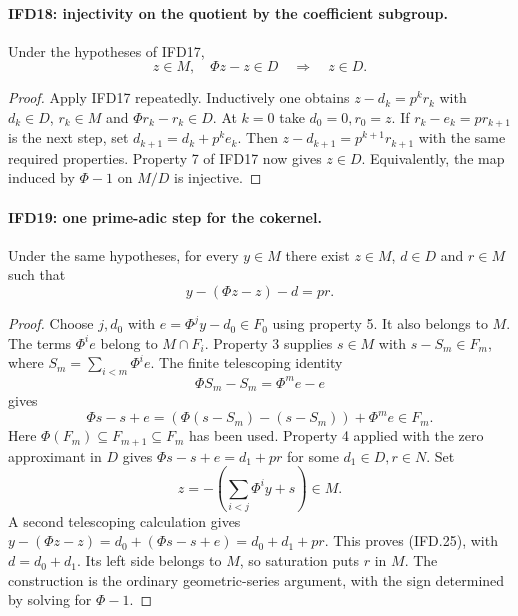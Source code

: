 \documentclass[11pt,a4paper]{article}
\numberwithin{equation}{section}
\theoremstyle{remark}\newtheorem{remark}[theorem]{Remark}
\begin{document}
\paragraph{IFD18: injectivity on the quotient by the coefficient subgroup.}
\label{claim:IFD18}
Under the hypotheses of IFD17,
\[
                 z\in M,\quad \Phi z-z\in D
                                    \quad\Longrightarrow\quad z\in D.
                                                               \tag{IFD.24}
\]

\begin{proof}
Apply IFD17 repeatedly. Inductively one obtains
$z-d_k=p^kr_k$ with $d_k\in D$, $r_k\in M$ and
$\Phi r_k-r_k\in D$. At $k=0$ take $d_0=0,r_0=z$.
If $r_k-e_k=pr_{k+1}$ is the next step, set
$d_{k+1}=d_k+p^ke_k$. Then
$z-d_{k+1}=p^{k+1}r_{k+1}$ with the same required properties.
Property 7 of IFD17 now gives $z\in D$.
Equivalently, the map induced by $\Phi-1$ on $M/D$ is injective.
\end{proof}

\paragraph{IFD19: one prime-adic step for the cokernel.}
\label{claim:IFD19}
Under the same hypotheses, for every $y\in M$ there exist
$z\in M$, $d\in D$ and $r\in M$ such that
\[
                         y-(\Phi z-z)-d=pr.                \tag{IFD.25}
\]

\begin{proof}
Choose $j,d_0$ with $e=\Phi^jy-d_0\in F_0$ using property 5.
It also belongs to $M$. The terms $\Phi^ie$ belong to $M\cap F_i$.
Property 3 supplies $s\in M$ with
$s-S_m\in F_m$, where $S_m=\sum_{i<m}\Phi^ie$.
The finite telescoping identity
\[
                          \Phi S_m-S_m=\Phi^me-e
\]
gives
\[
 \Phi s-s+e=(\Phi(s-S_m)-(s-S_m))+\Phi^me\in F_m.
\]
Here $\Phi(F_m)\subseteq F_{m+1}\subseteq F_m$ has been used.
Property 4 applied with the zero approximant in $D$ gives
$\Phi s-s+e=d_1+pr$ for some $d_1\in D,r\in N$.
Set
\[
                     z=-\left(\sum_{i<j}\Phi^iy+s\right)\in M.
\]
A second telescoping calculation gives
$y-(\Phi z-z)=d_0+(\Phi s-s+e)=d_0+d_1+pr$.
This proves (IFD.25), with $d=d_0+d_1$.
Its left side belongs to $M$, so saturation puts $r$ in $M$.
The construction is the ordinary geometric-series argument, with
the sign determined by solving for $\Phi-1$.
\end{proof}
\end{document}
